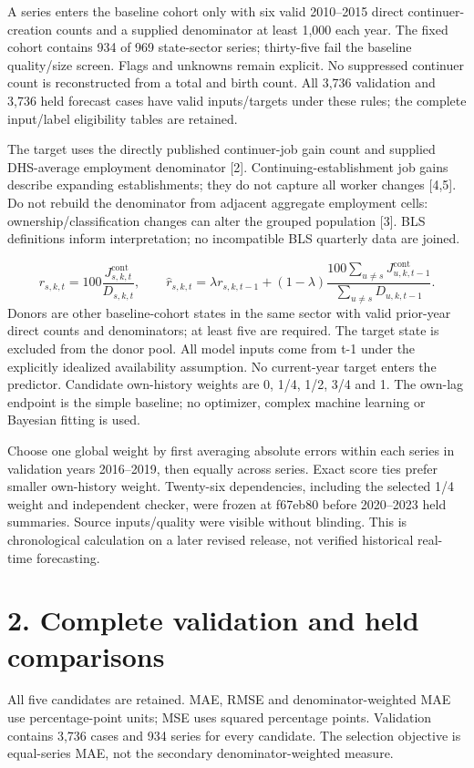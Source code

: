 \documentclass[11pt]{article}
\begin{document}
A series enters the baseline cohort only with six valid 2010--2015 direct continuer-creation counts and a supplied denominator at least 1,000 each year. The fixed cohort contains 934 of 969 state-sector series; thirty-five fail the baseline quality/size screen. Flags and unknowns remain explicit. No suppressed continuer count is reconstructed from a total and birth count. All 3,736 validation and 3,736 held forecast cases have valid inputs/targets under these rules; the complete input/label eligibility tables are retained.

The target uses the directly published continuer-job gain count and supplied DHS-average employment denominator [2]. Continuing-establishment job gains describe expanding establishments; they do not capture all worker changes [4,5]. Do not rebuild the denominator from adjacent aggregate employment cells: ownership/classification changes can alter the grouped population [3]. BLS definitions inform interpretation; no incompatible BLS quarterly data are joined.

\[r_{s,k,t}=100\frac{J^{\mathrm{cont}}_{s,k,t}}{D_{s,k,t}},\qquad \widehat r_{s,k,t}=\lambda r_{s,k,t-1}+(1-\lambda)\frac{100\sum_{u\ne s}J^{\mathrm{cont}}_{u,k,t-1}}{\sum_{u\ne s}D_{u,k,t-1}}.\]
Donors are other baseline-cohort states in the same sector with valid prior-year direct counts and denominators; at least five are required. The target state is excluded from the donor pool. All model inputs come from t-1 under the explicitly idealized availability assumption. No current-year target enters the predictor. Candidate own-history weights are 0, 1/4, 1/2, 3/4 and 1. The own-lag endpoint is the simple baseline; no optimizer, complex machine learning or Bayesian fitting is used.

Choose one global weight by first averaging absolute errors within each series in validation years 2016--2019, then equally across series. Exact score ties prefer smaller own-history weight. Twenty-six dependencies, including the selected 1/4 weight and independent checker, were frozen at f67eb80 before 2020--2023 held summaries. Source inputs/quality were visible without blinding. This is chronological calculation on a later revised release, not verified historical real-time forecasting.

\newpage\section*{2. Complete validation and held comparisons}
All five candidates are retained. MAE, RMSE and denominator-weighted MAE use percentage-point units; MSE uses squared percentage points. Validation contains 3,736 cases and 934 series for every candidate. The selection objective is equal-series MAE, not the secondary denominator-weighted measure.
\end{document}
